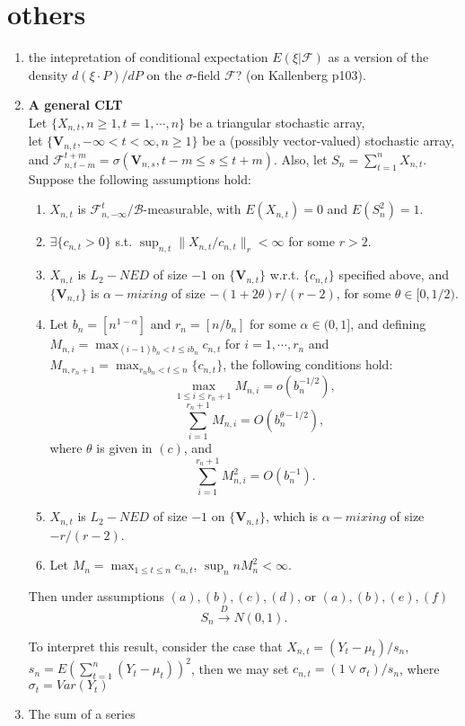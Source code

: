 \section{others}
\begin{enumerate}
\item the intepretation of conditional expectation $ E(\xi|\mathcal{F}) $ as a version of the density $ d(\xi\cdot P)/dP $ on the $ \sigma $-field $ \mathcal{F} $? (on Kallenberg p103).
\item \textbf{A general CLT}\\
Let $ \{X_{n,t}, n\geq 1,t=1,\cdots,n\} $ be a triangular stochastic array, \\
let $ \{\mathbf{V}_{n,t}, -\infty<t<\infty, n\geq 1\} $ be a (possibly vector-valued) stochastic array,\\
and $ \mathcal{F}_{n,t-m}^{t+m}=\sigma(\mathbf{V}_{n,s},t-m\leq s \leq t+m) $.
Also, let $ S_n=\sum_{t=1}^n X_{n,t} $.
Suppose the following assumptions hold:
\begin{enumerate}
\item $ X_{n,t} $ is $ \mathcal{F}_{n,-\infty}^t/\mathcal{B} $-measurable, with $ E(X_{n,t})=0 $ and $ E(S_n^2)=1 $.
\item $ \exists \{c_{n,t}>0\} $ s.t. $ \sup_{n,t}\|X_{n,t}/c_{n,t}\|_r<\infty $ for some $ r>2 $.
\item $ X_{n,t} $ is $ L_2-NED $ of size $ -1 $ on $ \{\mathbf{V}_{n,t} \} $ w.r.t. $ \{c_{n,t}\} $ specified above, and $ \{\mathbf{V}_{n,t}\} $ is $ \alpha-mixing $ of size $ -(1+2\theta)r/(r-2) $, for some $ \theta\in [0,1/2) $.
\item Let $ b_n=[n^{1-\alpha}] $ and $ r_n=[n/b_n] $ for some $ \alpha\in(0,1] $, and defining $ M_{n,i}=\max_{(i-1)b_n<t\leq i b_n} c_{n,t} $ for $ i=1,\cdots,r_n $ and $ M_{n,r_n+1}=\max_{r_nb_n<t\leq n}\{c_{n,t}\} $, the following conditions hold:
\[\max_{1\leq i\leq r_n+1}M_{n,i}=o(b_n^{-1/2}),\]
\[\sum_{i=1}^{r_n+1}M_{n,i}=O(b_n^{\theta-1/2}),\]
where $ \theta $ is given in $ (c) $, and
\[ \sum_{i=1}^{r_n+1} M_{n,i}^2=O(b_n^{-1}). \]
\item $ X_{n,t} $ is $ L_2-NED $ of size $ -1 $ on $ \{\mathbf{V}_{n,t}\} $, which is $ \alpha-mixing $ of size $ -r/(r-2) $.
\item Let $ M_n=\max_{1\leq t \leq n}c_{n,t} $,  $ \sup_n nM_n^2<\infty $.
\end {enumerate}
Then under assumptions $ (a),(b),(c),(d) $, or $ (a),(b),(e),(f) $
\[ S_n\xrightarrow{D}N(0,1). \]

To interpret this result, consider the case that $ X_{n,t}=(Y_t-\mu_t)/s_n $, $ s_n=E(\sum_{t=1}^n(Y_t-\mu_t))^2 $, then we may set $ c_{n,t}=(1\vee\sigma_t)/s_n $, where $ \sigma_t=Var(Y_t) $
\item The sum of a series


\end{enumerate}

